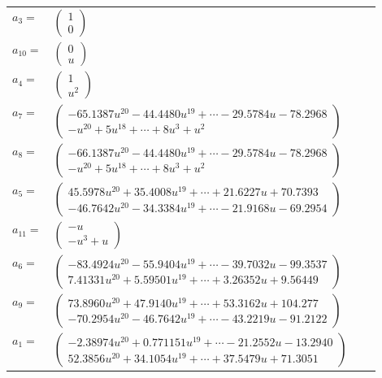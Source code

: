 \documentclass[1p]{elsarticle_modified}
\theoremstyle{definition}
\begin{document}
\begin{tabular}{m{7pt} m{180pt} m{7pt} m{180pt} }
\flushright $a_{3}=$&$\begin{pmatrix}1\\0\end{pmatrix}$ \\
\flushright $a_{10}=$&$\begin{pmatrix}0\\u\end{pmatrix}$ \\
\flushright $a_{4}=$&$\begin{pmatrix}1\\u^2\end{pmatrix}$ \\
\flushright $a_{7}=$&$\begin{pmatrix}-65.1387 u^{20}-44.4480 u^{19}+\cdots-29.5784 u-78.2968\\- u^{20}+5 u^{18}+\cdots+8 u^3+u^2\end{pmatrix}$ \\
\flushright $a_{8}=$&$\begin{pmatrix}-66.1387 u^{20}-44.4480 u^{19}+\cdots-29.5784 u-78.2968\\- u^{20}+5 u^{18}+\cdots+8 u^3+u^2\end{pmatrix}$ \\
\flushright $a_{5}=$&$\begin{pmatrix}45.5978 u^{20}+35.4008 u^{19}+\cdots+21.6227 u+70.7393\\-46.7642 u^{20}-34.3384 u^{19}+\cdots-21.9168 u-69.2954\end{pmatrix}$ \\
\flushright $a_{11}=$&$\begin{pmatrix}- u\\- u^3+u\end{pmatrix}$ \\
\flushright $a_{6}=$&$\begin{pmatrix}-83.4924 u^{20}-55.9404 u^{19}+\cdots-39.7032 u-99.3537\\7.41331 u^{20}+5.59501 u^{19}+\cdots+3.26352 u+9.56449\end{pmatrix}$ \\
\flushright $a_{9}=$&$\begin{pmatrix}73.8960 u^{20}+47.9140 u^{19}+\cdots+53.3162 u+104.277\\-70.2954 u^{20}-46.7642 u^{19}+\cdots-43.2219 u-91.2122\end{pmatrix}$ \\
\flushright $a_{1}=$&$\begin{pmatrix}-2.38974 u^{20}+0.771151 u^{19}+\cdots-21.2552 u-13.2940\\52.3856 u^{20}+34.1054 u^{19}+\cdots+37.5479 u+71.3051\end{pmatrix}$ \\

\end{tabular}
\end{document}
